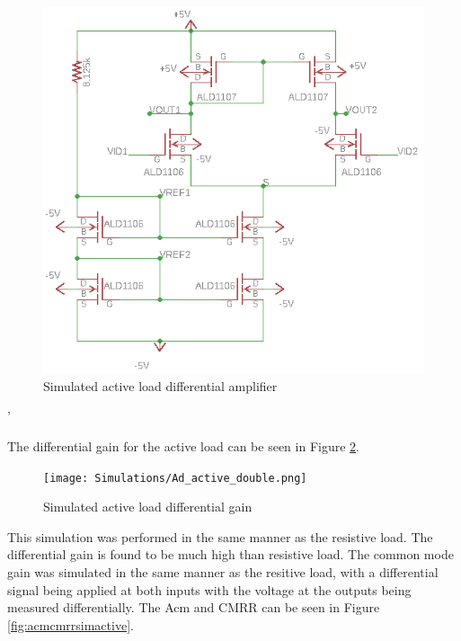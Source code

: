 \begin{figure}[H]
    \begin{center}
    \includegraphics[scale=.85]{Simulations/ActiveLoadedSimulated.png}
    \caption{Simulated active load differential amplifier}
    \label{fig:ActiveLoadSim}
    \end{center}
\end{figure}'

The differential gain for the active load can be seen in Figure \ref{fig:activeAdsim}.


\begin{figure}[H]
    \begin{center}
    \texttt{[image: Simulations/Ad\_active\_double.png]}
    \caption{Simulated active load differential gain}
    \label{fig:activeAdsim}
    \end{center}
\end{figure}
This simulation was performed in the same manner as the resistive load. The differential gain is found to be much high than resistive load. The common mode gain was simulated in the same manner as the resitive load, with a differential signal being applied at both inputs with the voltage at the outputs being measured differentially. The Acm and CMRR can be seen in Figure \ref{fig:acmcmrrsimactive}.



